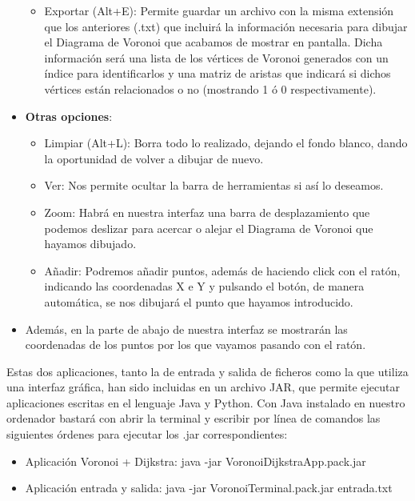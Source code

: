 \begin{itemize}
\begin{itemize}
                \item Exportar (Alt+E): Permite guardar un archivo con la misma extensión que los anteriores (.txt) que incluirá la información necesaria para dibujar el Diagrama de Voronoi que acabamos de mostrar en pantalla. Dicha información será una lista de los vértices de Voronoi generados con un índice para identificarlos y una matriz de aristas que indicará si dichos vértices están relacionados o no (mostrando 1 ó 0 respectivamente).
             \end{itemize}
        \item \textbf{Otras opciones}:
            \begin{itemize}
                \item Limpiar (Alt+L): Borra todo lo realizado, dejando el fondo blanco, dando la oportunidad de volver a dibujar de nuevo.
                \item Ver: Nos permite ocultar la barra de herramientas si así lo deseamos.
                \item Zoom: Habrá en nuestra interfaz una barra de desplazamiento que podemos deslizar para acercar o alejar el Diagrama de Voronoi que hayamos dibujado. 
                \item Añadir: Podremos añadir puntos, además de haciendo click con el ratón, indicando las coordenadas X e Y y pulsando el botón, de manera automática, se nos dibujará el punto que hayamos introducido.
           \end{itemize}        
        \item Además, en la parte de abajo de nuestra interfaz se mostrarán las coordenadas de los puntos por los que vayamos pasando con el ratón.
\end{itemize}

Estas dos aplicaciones, tanto la de entrada y salida de ficheros como la que utiliza una interfaz gráfica, han sido incluidas en un archivo JAR, que permite ejecutar aplicaciones escritas en el lenguaje Java y Python. Con Java instalado en nuestro ordenador bastará con abrir la terminal y escribir por línea de comandos las siguientes órdenes para ejecutar los .jar correspondientes:
 \begin{itemize}
        \item Aplicación Voronoi + Dijkstra: java -jar VoronoiDijkstraApp.pack.jar
        \item Aplicación entrada y salida: java -jar VoronoiTerminal.pack.jar entrada.txt
\end{itemize}

